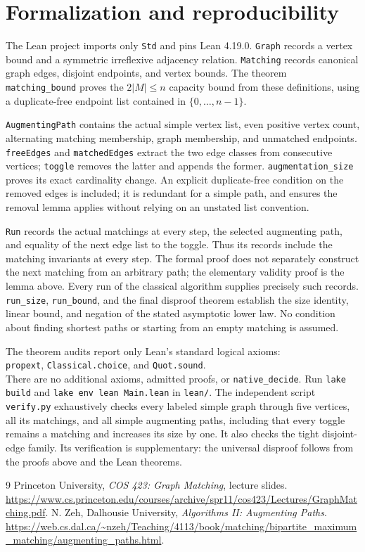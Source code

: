 \documentclass[11pt]{article}
\begin{document}
\section{Formalization and reproducibility}
The Lean project imports only \texttt{Std} and pins Lean 4.19.0. \texttt{Graph} records a vertex bound and a symmetric irreflexive adjacency relation. \texttt{Matching} records canonical graph edges, disjoint endpoints, and vertex bounds. The theorem \texttt{matching\_bound} proves the $2|M|\le n$ capacity bound from these definitions, using a duplicate-free endpoint list contained in $\{0,\ldots,n-1\}$.

\texttt{AugmentingPath} contains the actual simple vertex list, even positive vertex count, alternating matching membership, graph membership, and unmatched endpoints. \texttt{freeEdges} and \texttt{matchedEdges} extract the two edge classes from consecutive vertices; \texttt{toggle} removes the latter and appends the former. \texttt{augmentation\_size} proves its exact cardinality change. An explicit duplicate-free condition on the removed edges is included; it is redundant for a simple path, and ensures the removal lemma applies without relying on an unstated list convention.

\texttt{Run} records the actual matchings at every step, the selected augmenting path, and equality of the next edge list to the toggle. Thus its records include the matching invariants at every step. The formal proof does not separately construct the next matching from an arbitrary path; the elementary validity proof is the lemma above. Every run of the classical algorithm supplies precisely such records. \texttt{run\_size}, \texttt{run\_bound}, and the final disproof theorem establish the size identity, linear bound, and negation of the stated asymptotic lower law. No condition about finding shortest paths or starting from an empty matching is assumed.

The theorem audits report only Lean's standard logical axioms:\\[2pt] \texttt{propext}, \texttt{Classical.choice}, and \texttt{Quot.sound}.\\[2pt] There are no additional axioms, admitted proofs, or \texttt{native\_decide}. Run \texttt{lake build} and \texttt{lake env lean Main.lean} in \texttt{lean/}. The independent script \texttt{verify.py} exhaustively checks every labeled simple graph through five vertices, all its matchings, and all simple augmenting paths, including that every toggle remains a matching and increases its size by one. It also checks the tight disjoint-edge family. Its verification is supplementary: the universal disproof follows from the proofs above and the Lean theorems.

\begin{thebibliography}{9}
 Princeton University, \emph{COS 423: Graph Matching}, lecture slides. \url{https://www.cs.princeton.edu/courses/archive/spr11/cos423/Lectures/GraphMatching.pdf}.
 N. Zeh, Dalhousie University, \emph{Algorithms II: Augmenting Paths}. \url{https://web.cs.dal.ca/~nzeh/Teaching/4113/book/matching/bipartite_maximum_matching/augmenting_paths.html}.
\end{thebibliography}
\end{document}
